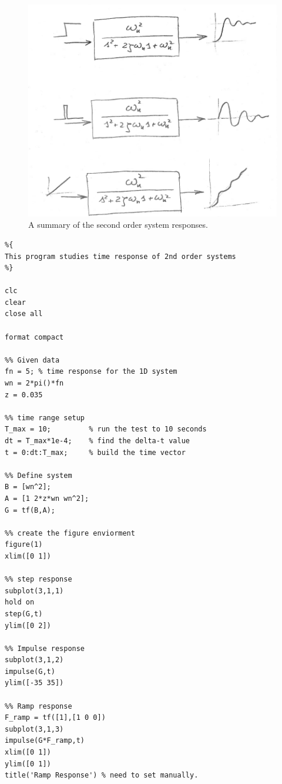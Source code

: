 \documentclass[12pt,letter]{article}
\begin{document}
\begin{figure}[H]
	\centering
	\includegraphics[width=4.5in]{../figures/Summary_of_second_order_system_response}
	\caption{A summary of the second order system responses.}
\end{figure}

\lstset{linewidth=5.8in}
\begin{minipage}{1\textwidth}
	\begin{center}
		\begin{lstlisting}
%{
This program studies time response of 2nd order systems
%}

clc
clear
close all

format compact

%% Given data
fn = 5; % time response for the 1D system
wn = 2*pi()*fn
z = 0.035

%% time range setup
T_max = 10;         % run the test to 10 seconds
dt = T_max*1e-4;    % find the delta-t value 
t = 0:dt:T_max;     % build the time vector

%% Define system
B = [wn^2];
A = [1 2*z*wn wn^2];
G = tf(B,A); 

%% create the figure enviorment
figure(1)
xlim([0 1])

%% step response 
subplot(3,1,1)
hold on
step(G,t)
ylim([0 2])

%% Impulse response
subplot(3,1,2)
impulse(G,t)
ylim([-35 35])

%% Ramp response
F_ramp = tf([1],[1 0 0])
subplot(3,1,3)
impulse(G*F_ramp,t)
xlim([0 1])
ylim([0 1])
title('Ramp Response') % need to set manually. 
		\end{lstlisting}
	\end{center}
\end{minipage}
\end{document}
